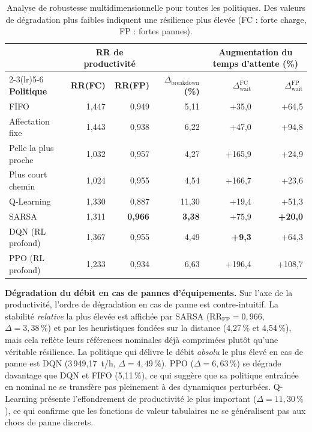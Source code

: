 \documentclass[11pt,a4paper]{article}
\begin{document}
\begin{table}[H]
\centering
\caption{Analyse de robustesse multidimensionnelle pour toutes les politiques. Des valeurs de dégradation plus faibles indiquent une résilience plus élevée (FC : forte charge, FP : fortes pannes).}
\label{tab:robustness}
\small
\setlength{\tabcolsep}{4.5pt}
\begin{tabular}{l r r r r r}
\toprule
 & \multicolumn{2}{c}{\textbf{RR de productivité}} & \textbf{} & \multicolumn{2}{c}{\textbf{Augmentation du temps d'attente (\%)}} \\
\cmidrule(lr){2-3}\cmidrule(lr){5-6}
\textbf{Politique} & \textbf{RR(FC)} & \textbf{RR(FP)} & \textbf{$\Delta_{\mathrm{breakdown}}$ (\%)} & \textbf{$\Delta_{\mathrm{wait}}^{\mathrm{FC}}$} & \textbf{$\Delta_{\mathrm{wait}}^{\mathrm{FP}}$} \\
\midrule
FIFO               & 1,447 & 0,949 &  5,11  & +35,0  & +64,5  \\
Affectation fixe   & 1,443 & 0,938 &  6,22  & +47,0  & +94,8  \\
Pelle la plus proche & 1,032 & 0,957 &  4,27  & +165,9 & +24,9  \\
Plus court chemin  & 1,024 & 0,955 &  4,54  & +166,7 & +23,6  \\
Q-Learning         & 1,330 & 0,887 & 11,30  & +19,4  & +51,3  \\
SARSA              & 1,311 & \textbf{0,966} & \textbf{3,38} & +75,9 & \textbf{+20,0} \\
DQN (RL profond)   & 1,367 & 0,955 &  4,49  & \textbf{+9,3}  & +64,3  \\
PPO (RL profond)   & 1,233 & 0,934 &  6,63  & +196,4 & +108,7 \\
\bottomrule
\end{tabular}
\end{table}

\noindent\textbf{Dégradation du débit en cas de pannes d'équipements.} Sur l'axe de la productivité, l'ordre de dégradation en cas de panne est contre-intuitif. La stabilité \emph{relative} la plus élevée est affichée par SARSA ($\mathrm{RR}_{\mathrm{FP}}=0{,}966$, $\Delta=3{,}38\,\%$) et par les heuristiques fondées sur la distance (4,27\,\% et 4,54\,\%), mais cela reflète leurs références nominales déjà comprimées plutôt qu'une véritable résilience. La politique qui délivre le débit \emph{absolu} le plus élevé en cas de panne est DQN (3\,949,17~t/h, $\Delta=4{,}49\,\%$). PPO ($\Delta=6{,}63\,\%$) se dégrade davantage que DQN et FIFO (5,11\,\%), ce qui suggère que sa politique entraînée en nominal ne se transfère pas pleinement à des dynamiques perturbées. Q-Learning présente l'effondrement de productivité le plus important ($\Delta=11{,}30\,\%$), ce qui confirme que les fonctions de valeur tabulaires ne se généralisent pas aux chocs de panne discrets.
\end{document}
